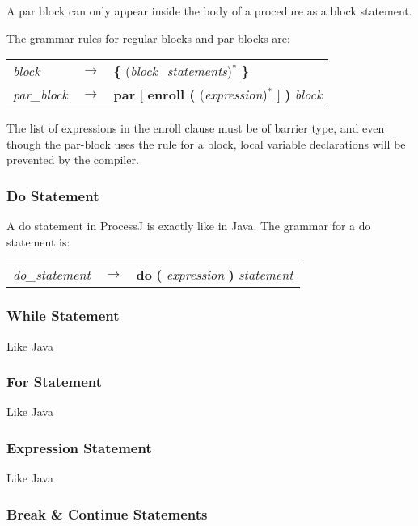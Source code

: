 \documentclass[pdflatex,11pt,letter]{article}
\begin{document}
A par block can only appear inside the body of a procedure as a block statement.

The grammar rules for regular blocks and par-blocks are:
\begin{center}
\begin{tabular}{lll}
{\it block} & $\rightarrow$ & {\bf \{} ({\it block\_statements})$^*$ {\bf \}}\\
{\it par\_block} & $\rightarrow$ & {\bf par} [ {\bf enroll (} ({\it expression})$^*$ ] {\bf )} {\it block}\\
\end{tabular}
\end{center}

The list of expressions in the enroll clause must be of barrier type, and even though the par-block uses the rule for a block, local variable declarations will be prevented by the compiler.

\subsubsection{Do Statement}

A do statement in ProcessJ is exactly like in Java. The grammar for a do statement is:

\begin{center}
	\begin{tabular}{lll}
		{\it do\_statement} & $\rightarrow$ & {\bf do} {\bf (} {\it expression} {\bf )} {\it statement}
	\end{tabular}
\end{center}

\subsubsection{While Statement}

Like Java

\subsubsection{For Statement}

Like Java

\subsubsection{Expression Statement}

Like Java

\subsubsection{Break \& Continue Statements}
\end{document}
